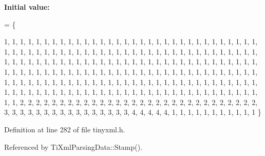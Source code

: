 {\bfseries Initial value\+:}
\begin{DoxyCode}
=
  \{
    
    1,  1,      1,      1,      1,      1,      1,      1,      1,      1,      1,      1,      1,      1, 
           1,      1,      
    1,  1,      1,      1,      1,      1,      1,      1,      1,      1,      1,      1,      1,      1, 
           1,      1,      
    1,  1,      1,      1,      1,      1,      1,      1,      1,      1,      1,      1,      1,      1, 
           1,      1,      
    1,  1,      1,      1,      1,      1,      1,      1,      1,      1,      1,      1,      1,      1, 
           1,      1,      
    1,  1,      1,      1,      1,      1,      1,      1,      1,      1,      1,      1,      1,      1, 
           1,      1,      
    1,  1,      1,      1,      1,      1,      1,      1,      1,      1,      1,      1,      1,      1, 
           1,      1,      
    1,  1,      1,      1,      1,      1,      1,      1,      1,      1,      1,      1,      1,      1, 
           1,      1,      
    1,  1,      1,      1,      1,      1,      1,      1,      1,      1,      1,      1,      1,      1, 
           1,      1,      
    1,  1,      1,      1,      1,      1,      1,      1,      1,      1,      1,      1,      1,      1, 
           1,      1,      
    1,  1,      1,      1,      1,      1,      1,      1,      1,      1,      1,      1,      1,      1, 
           1,      1,      
    1,  1,      1,      1,      1,      1,      1,      1,      1,      1,      1,      1,      1,      1, 
           1,      1,      
    1,  1,      1,      1,      1,      1,      1,      1,      1,      1,      1,      1,      1,      1, 
           1,      1,      
    1,  1,      2,      2,      2,      2,      2,      2,      2,      2,      2,      2,      2,      2, 
           2,      2,      
    2,  2,      2,      2,      2,      2,      2,      2,      2,      2,      2,      2,      2,      2, 
           2,      2,      
    3,  3,      3,      3,      3,      3,      3,      3,      3,      3,      3,      3,      3,      3, 
           3,      3,      
    4,  4,      4,      4,      4,      1,      1,      1,      1,      1,      1,      1,      1,      1, 
           1,      1       
  \}
\end{DoxyCode}


Definition at line 282 of file tinyxml.\+h.



Referenced by Ti\+Xml\+Parsing\+Data\+::\+Stamp().




